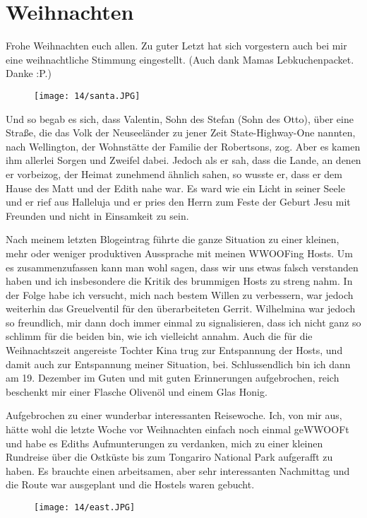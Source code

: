 \chapter{Weihnachten}

Frohe Weihnachten euch allen. Zu guter Letzt hat sich vorgestern auch
bei mir eine weihnachtliche Stimmung eingestellt. (Auch dank Mamas
Lebkuchenpacket. Danke :P.)
\begin{figure}[h]
  \centering
  \texttt{[image: 14/santa.JPG]}
\end{figure}

\begin{quoting}
Und so begab es sich, dass Valentin, Sohn des Stefan
(Sohn des Otto), über eine Straße, die das Volk der Neuseeländer zu
jener Zeit State-Highway-One nannten, nach Wellington, der Wohnstätte
der Familie der Robertsons, zog. Aber es kamen ihm allerlei Sorgen und
Zweifel dabei. Jedoch als er sah, dass die Lande, an denen er vorbeizog,
der Heimat zunehmend ähnlich sahen, so wusste er, dass er dem
Hause des Matt und der Edith nahe war. Es ward wie ein Licht in seiner
Seele und er rief aus Halleluja und er pries den Herrn zum Feste der
Geburt Jesu mit Freunden und nicht in Einsamkeit zu sein.
\end{quoting}

Nach meinem letzten Blogeintrag führte die ganze Situation zu einer
kleinen, mehr oder weniger produktiven Aussprache mit meinen WWOOFing
Hosts. Um es zusammenzufassen kann man wohl sagen, dass wir uns etwas
falsch verstanden haben und ich insbesondere die Kritik des brummigen
Hosts zu streng nahm. In der Folge habe ich versucht, mich nach bestem
Willen zu verbessern, war jedoch weiterhin das Greuelventil für den
überarbeiteten Gerrit. Wilhelmina war jedoch so freundlich, mir dann
doch immer einmal zu signalisieren, dass ich nicht ganz so schlimm für
die beiden bin, wie ich vielleicht annahm. Auch die für die
Weihnachtszeit angereiste Tochter Kina trug zur Entspannung der Hosts,
und damit auch zur Entspannung meiner Situation, bei. Schlussendlich bin
ich dann am 19. Dezember im Guten und mit guten Erinnerungen
aufgebrochen, reich beschenkt mir einer Flasche Olivenöl und einem Glas
Honig.

Aufgebrochen zu einer wunderbar interessanten Reisewoche. Ich, von mir
aus, hätte wohl die letzte Woche vor Weihnachten einfach noch einmal
geWWOOFt und habe es Ediths Aufmunterungen zu verdanken, mich zu einer
kleinen Rundreise über die Ostküste bis zum Tongariro National Park
aufgerafft zu haben. Es brauchte einen arbeitsamen, aber sehr
interessanten Nachmittag und die Route war ausgeplant und die Hostels
waren gebucht.
\begin{figure}[h]
  \centering
  \texttt{[image: 14/east.JPG]}
\end{figure}

